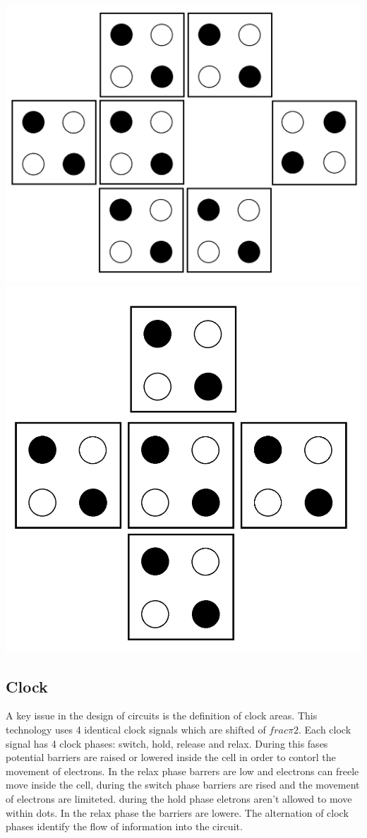 \includegraphics[scale=0.1]{img/not_normal.png}
\includegraphics[scale=0.1]{img/majority.png}

\subsection{Clock}
A key issue in the design of circuits is the definition of clock areas. This technology uses 4 identical clock signals which are shifted of $frac{\pi}{2}$. Each clock signal has 4 clock phases: switch, hold, release and relax. During this fases potential barriers are raised or lowered inside the cell in order to contorl the movement of electrons. In the relax phase barrers are low and electrons can freele move inside the cell, during the switch phase barriers are rised and the movement of electrons are limiteted. during the hold phase eletrons aren't allowed to move within dots. In the relax phase the barriers are lowere. The alternation of clock phases identify the flow of information into the circuit. 


